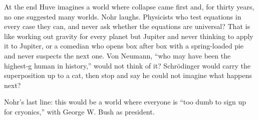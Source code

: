 At the end Huve imagines a world where collapse came first and, for thirty years, no one suggested many worlds. Nohr laughs. Physicists who test equations in every case they can, and never ask whether the equations are universal? That is like working out gravity for every planet but Jupiter and never thinking to apply it to Jupiter, or a comedian who opens box after box with a spring-loaded pie and never suspects the next one. Von Neumann, ``who may have been the highest-g human in history,'' would not think of it? Schrödinger would carry the superposition up to a cat, then stop and say he could not imagine what happens next? 

Nohr's last line: this would be a world where everyone is ``too dumb to sign up for cryonics,'' with George W. Bush as president.
